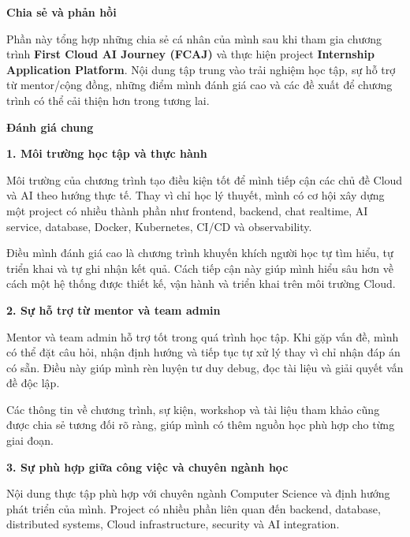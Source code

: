 \vspace{0.5em}\noindent\textbf{Chia sẻ và phản
hồi}\par

Phần này tổng hợp những chia sẻ cá nhân của mình sau khi tham gia chương
trình \textbf{First Cloud AI Journey (FCAJ)} và thực hiện project
\textbf{Internship Application Platform}. Nội dung tập trung vào trải
nghiệm học tập, sự hỗ trợ từ mentor/cộng đồng, những điểm mình đánh giá
cao và các đề xuất để chương trình có thể cải thiện hơn trong tương lai.

\vspace{0.5em}\noindent\textbf{Đánh giá chung}\par

\vspace{0.5em}\noindent\textbf{1. Môi trường học tập và thực
hành}\par

Môi trường của chương trình tạo điều kiện tốt để mình tiếp cận các chủ
đề Cloud và AI theo hướng thực tế. Thay vì chỉ học lý thuyết, mình có cơ
hội xây dựng một project có nhiều thành phần như frontend, backend, chat
realtime, AI service, database, Docker, Kubernetes, CI/CD và
observability.

Điều mình đánh giá cao là chương trình khuyến khích người học tự tìm
hiểu, tự triển khai và tự ghi nhận kết quả. Cách tiếp cận này giúp mình
hiểu sâu hơn về cách một hệ thống được thiết kế, vận hành và triển khai
trên môi trường Cloud.

\vspace{0.5em}\noindent\textbf{2. Sự hỗ trợ từ mentor và team
admin}\par

Mentor và team admin hỗ trợ tốt trong quá trình học tập. Khi gặp vấn đề,
mình có thể đặt câu hỏi, nhận định hướng và tiếp tục tự xử lý thay vì
chỉ nhận đáp án có sẵn. Điều này giúp mình rèn luyện tư duy debug, đọc
tài liệu và giải quyết vấn đề độc lập.

Các thông tin về chương trình, sự kiện, workshop và tài liệu tham khảo
cũng được chia sẻ tương đối rõ ràng, giúp mình có thêm nguồn học phù hợp
cho từng giai đoạn.

\vspace{0.5em}\noindent\textbf{3. Sự phù hợp giữa công việc và chuyên ngành
học}\par

Nội dung thực tập phù hợp với chuyên ngành Computer Science và định
hướng phát triển của mình. Project có nhiều phần liên quan đến backend,
database, distributed systems, Cloud infrastructure, security và AI
integration.

